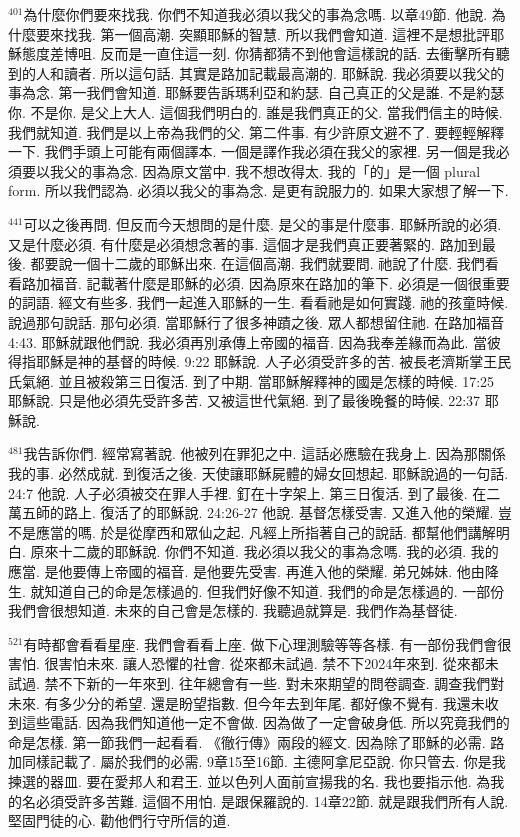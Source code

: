 \documentclass{book}
\begin{document}
$^{401}$為什麼你們要來找我.
你們不知道我必須以我父的事為念嗎.
以章49節.
他說.
為什麼要來找我.
第一個高潮.
突顯耶穌的智慧.
所以我們會知道.
這裡不是想批評耶穌態度差博咀.
反而是一直住這一刻.
你猜都猜不到他會這樣說的話.
去衝擊所有聽到的人和讀者.
所以這句話.
其實是路加記載最高潮的.
耶穌說.
我必須要以我父的事為念.
第一我們會知道.
耶穌要告訴瑪利亞和約瑟.
自己真正的父是誰.
不是約瑟你.
不是你.
是父上大人.
這個我們明白的.
誰是我們真正的父.
當我們信主的時候.
我們就知道.
我們是以上帝為我們的父.
第二件事.
有少許原文避不了.
要輕輕解釋一下.
我們手頭上可能有兩個譯本.
一個是譯作我必須在我父的家裡.
另一個是我必須要以我父的事為念.
因為原文當中.
我不想改得太.
我的「的」是一個 plural form.
所以我們認為.
必須以我父的事為念.
是更有說服力的.
如果大家想了解一下.

$^{441}$可以之後再問.
但反而今天想問的是什麼.
是父的事是什麼事.
耶穌所說的必須.
又是什麼必須.
有什麼是必須想念著的事.
這個才是我們真正要著緊的.
路加到最後.
都要說一個十二歲的耶穌出來.
在這個高潮.
我們就要問.
祂說了什麼.
我們看看路加福音.
記載著什麼是耶穌的必須.
因為原來在路加的筆下.
必須是一個很重要的詞語.
經文有些多.
我們一起進入耶穌的一生.
看看祂是如何實踐.
祂的孩童時候.
說過那句說話.
那句必須.
當耶穌行了很多神蹟之後.
眾人都想留住祂.
在路加福音4:43.
耶穌就跟他們說.
我必須再別承傳上帝國的福音.
因為我奉差緣而為此.
當彼得指耶穌是神的基督的時候.
9:22 耶穌說.
人子必須受許多的苦.
被長老濟斯掌王民氏氣絕.
並且被殺第三日復活.
到了中期.
當耶穌解釋神的國是怎樣的時候.
17:25 耶穌說.
只是他必須先受許多苦.
又被這世代氣絕.
到了最後晚餐的時候.
22:37 耶穌說.

$^{481}$我告訴你們.
經常寫著說.
他被列在罪犯之中.
這話必應驗在我身上.
因為那關係我的事.
必然成就.
到復活之後.
天使讓耶穌屍體的婦女回想起.
耶穌說過的一句話.
24:7 他說.
人子必須被交在罪人手裡.
釘在十字架上.
第三日復活.
到了最後.
在二萬五師的路上.
復活了的耶穌說.
24:26-27 他說.
基督怎樣受害.
又進入他的榮耀.
豈不是應當的嗎.
於是從摩西和眾仙之起.
凡經上所指著自己的說話.
都幫他們講解明白.
原來十二歲的耶穌說.
你們不知道.
我必須以我父的事為念嗎.
我的必須.
我的應當.
是他要傳上帝國的福音.
是他要先受害.
再進入他的榮耀.
弟兄姊妹.
他由降生.
就知道自己的命是怎樣過的.
但我們好像不知道.
我們的命是怎樣過的.
一部份我們會很想知道.
未來的自己會是怎樣的.
我聽過就算是.
我們作為基督徒.

$^{521}$有時都會看看星座.
我們會看看上座.
做下心理測驗等等各樣.
有一部份我們會很害怕.
很害怕未來.
讓人恐懼的社會.
從來都未試過.
禁不下2024年來到.
從來都未試過.
禁不下新的一年來到.
往年總會有一些.
對未來期望的問卷調查.
調查我們對未來.
有多少分的希望.
還是盼望指數.
但今年去到年尾.
都好像不覺有.
我還未收到這些電話.
因為我們知道他一定不會做.
因為做了一定會破身低.
所以究竟我們的命是怎樣.
第一節我們一起看看.
《徹行傳》兩段的經文.
因為除了耶穌的必需.
路加同樣記載了.
屬於我們的必需.
9章15至16節.
主德阿拿尼亞說.
你只管去.
你是我揀選的器皿.
要在愛邦人和君王.
並以色列人面前宣揚我的名.
我也要指示他.
為我的名必須受許多苦難.
這個不用怕.
是跟保羅說的.
14章22節.
就是跟我們所有人說.
堅固門徒的心.
勸他們行守所信的道.
\end{document}
